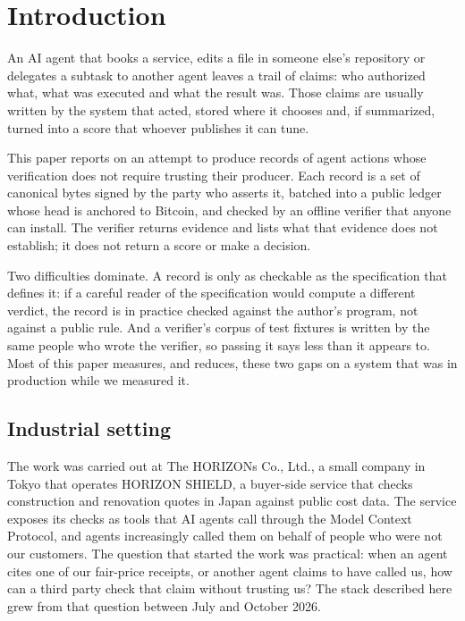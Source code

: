 \documentclass[preprint,12pt,authoryear]{elsarticle}
\begin{document}
\linenumbers

\section{Introduction}

An AI agent that books a service, edits a file in someone else's repository or delegates a subtask to another agent leaves a trail of claims: who authorized what, what was executed and what the result was. Those claims are usually written by the system that acted, stored where it chooses and, if summarized, turned into a score that whoever publishes it can tune.

This paper reports on an attempt to produce records of agent actions whose verification does not require trusting their producer. Each record is a set of canonical bytes signed by the party who asserts it, batched into a public ledger whose head is anchored to Bitcoin, and checked by an offline verifier that anyone can install. The verifier returns evidence and lists what that evidence does not establish; it does not return a score or make a decision.

Two difficulties dominate. A record is only as checkable as the specification that defines it: if a careful reader of the specification would compute a different verdict, the record is in practice checked against the author's program, not against a public rule. And a verifier's corpus of test fixtures is written by the same people who wrote the verifier, so passing it says less than it appears to. Most of this paper measures, and reduces, these two gaps on a system that was in production while we measured it.

\subsection{Industrial setting}\label{sec:setting}

The work was carried out at The HORIZONs Co., Ltd., a small company in Tokyo that operates HORIZON SHIELD, a buyer-side service that checks construction and renovation quotes in Japan against public cost data. The service exposes its checks as tools that AI agents call through the Model Context Protocol, and agents increasingly called them on behalf of people who were not our customers. The question that started the work was practical: when an agent cites one of our fair-price receipts, or another agent claims to have called us, how can a third party check that claim without trusting us? The stack described here grew from that question between July and October 2026.
\end{document}
